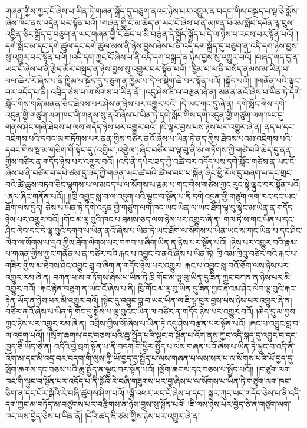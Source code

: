 གཞན་གྱིས་ཀྱང་ངོ་ཞེས་པ་ཡིན་ཏེ་གཞན་སྐྲོད་དུ་བཅུག་ནའང་ཉེས་པར་འགྱུར་ན་བདག་གིས་བསྐྲད་པ་ལྟ་ཅེ་སྨོས་ཞེས་ཁོང་ནས་འདྲེན་པར་སྟོན་པའོ། །གཞན་གྱི་ངོ་མ་ཆོད་ན་ཡང་ངོ་ཞེས་པ་ནི་མཁན་པོའམ་སློབ་དཔོན་ལྟ་བུས་འབྱིན་ཅིང་སྐྲོད་དུ་བཅུག་ན་ཡང་གཞན་གྱི་ངོ་ཆོད་པ་མི་བརྩན་དེ་སྐྲོད་སྐྲོད་པ་དེ་ལ་ཉེས་པ་རངས་པར་སྟོན་པའོ། །དགེ་སློང་མ་དང་དགེ་ཚུལ་དང་དགེ་ཚུལ་མས་ནི་ཉེས་བྱས་ཞེས་པ་ནི་འདི་དག་སྐྲོད་དུ་བཅུག་ན་འདི་དག་ཉེས་བྱས་སུ་འགྱུར་བར་སྟོན་པའོ། །འདི་དག་ཀྱང་ངོ་ཞེས་པ་ནི་འདི་དག་བསྐྲད་ན་ཉེས་བྱས་སུ་འགྱུར་བའོ། །བཞད་གད་དུ་ན་ཡང་ངོ་ཞེས་པ་ནི་རྩེད་མོར་བསྐྲད་ན་ཉེས་བྱས་སུ་འགྱུར་བར་སྟོན་པའོ། །ཁྱིམ་པ་ལ་ནི་བསོད་ནམས་མ་ཡིན་པ་ཕལ་ཆེར་རོ་ཞེས་པ་ནི་ཁྱིམ་པ་སྐྲོད་དུ་བཅུག་ན་ཁྱིམ་པ་དེ་ལ་སྡིག་ཆེ་བར་སྟོན་པའོ། །སྐྲོད་པའོ།། །།གནོན་པའི་ལྟུང་བར་འདོད་པ་ནི། འབྲིད་ཅེས་པ་ལ་སོགས་པ་ཡིན་ནོ། །འདུ་ཤེས་ཇི་ལ་བརྩན་ཞེ་ན། མནན་ནའོ་ཞེས་པ་ཡིན་ཏེ་དགེ་སློང་གིས་གཞི་མནན་ཅིང་ཐེབས་པར་ཤེས་ན་ཉེས་པར་འགྱུར་བའོ། །དེ་ཡང་གང་དུ་ཞེ་ན། དགེ་སློང་གིས་དགེ་འདུན་གྱི་གཙུག་ལག་ཁང་གི་གནས་སུ་ནའོ་ཞེས་པ་ཡིན་ཏེ་དགེ་སློང་གིས་དགེ་འདུན་གྱི་གཙུག་ལག་ཁང་དུ་གནས་ཤིང་གཞི་ཐེབས་པ་ལས་གདོད་ཉེས་པར་འགྱུར་བའོ། །ཇི་ལྟར་བྱས་པས་ཉེས་པར་འགྱུར་ཞེ་ན། ནད་པ་དང་འཇིགས་པའི་དབང་མ་གཏོགས་པར་ནན་གྱིས་བཙིར་ནའོ་ཞེས་པ་ཡིན་ཏེ་ནད་ཀྱིས་ཐེབས་པའམ་འཇིགས་པའི་དབང་གིས་སྔ་མ་གཅིག་གི་སྟེང་དུ་(འགྱིལ་‚འགྱེལ་)ཞིང་བཙིར་བ་ལྟ་བུ་ནི་མ་གཏོགས་ཀྱི་གཙེ་བའི་ཆེད་དུ་ནན་གྱིས་བཙིར་ན་གདོད་ཉེས་པར་འགྱུར་བའོ། །འདི་ནི་དཔེར་ཟད་ཀྱི་འཚེ་བར་འདོད་པས་དགེ་སློང་གཙེས་ན་ཡང་ངོ་ཞེས་པ་ནི་བཙིར་བ་དཔེ་ཙམ་དུ་ཟད་ཀྱི་གཞན་ཡང་ཚ་བའི་ཚེ་ལ་བབ་པ་སྐོན་ཞིང་ཕྱི་རོལ་དུ་བཞག་པ་དང་གྲང་བའི་ཚེ་ཆུས་བཏབ་ཅིང་ལྷགས་པ་ལ་མངད་པ་ལ་སོགས་པ་རྣམ་པ་གང་གིས་གཙེས་ཀྱང་རུང་སྟེ་ལྟུང་བར་སྟོན་པའོ། །ཞལ་ཞིང་གནོན་པའོ།། །།ཁྲི་འབྱུང་སླ་བ་ལ་འདུག་པའི་ལྟུང་བ་སྟོན་པ་ནི་དགེ་འདུན་གྱི་གཙུག་ལག་ཁང་དང་ཡང་ཐོག་ལས་བྱེད། ཅེས་པ་ཡིན་ཏེ་དགེ་འདུན་གྱི་གཙུག་ལག་ཁང་ཡང་ཡིན་ལ་ཡང་ཐོག་ལྟ་བུ་སྟེང་མ་ཡིན་ན་གདོད་ཉེས་པར་འགྱུར་བའོ། །གོང་མ་ལྟ་བུའི་ཁང་པ་ཐམས་ཅད་ལས་ཉེས་པར་འགྱུར་ཞེ་ན། གལ་ཏེ་ས་གང་ཡིན་པ་དང་ཤིང་ལེབ་དང་དེ་ལྟ་བུའི་དགབ་པ་ཡིན་ནའོ་ཞེས་པ་ཡིན་ཏེ་ཡང་ཐོག་ལ་སོགས་པ་ཡིན་ཡང་ས་གང་ཡིན་པ་དང་ཤིང་ལེབ་ལ་སོགས་པ་དྲབ་ཀྱིས་ཐོག་ལེགས་པར་བཀབ་པ་ཞིག་ཡིན་ན་ཉེས་པར་སྟོན་པའོ། །ཉེས་པར་འགྱུར་བའི་རྣམ་པ་གཞན་གྱིས་ཀྱང་གནོན་པ་ན་བཙིར་བའི་རྐང་པ་འབྱུང་བ་ནའོ་ཞེས་པ་ཡིན་ཏེ། ཁྲི་འམ་ཁྲིའུ་བཙིར་བའི་རྐང་པ་གཟིར་གྱིས་མ་ཐེབས་ཤིང་འབྱུང་བླ་བ་ཞིག་ན་གདོད་ཉེས་པར་འགྱུར། རྐང་པ་འབྱུང་སླ་བའོ་ཅོག་ལས་ཉེས་པར་འགྱུར་རམ་ཞེ་ན། བཀན་པ་མ་གཏོགས་ཞེས་པ་ཡིན་ཏེ་ཁྲི་གོང་མ་ལྟ་བུ་ཡིན་དུ་ཟིན་ཀྱང་བཀན་ན་ཉེས་པར་མི་འགྱུར་བའོ། །རྐང་རྟེན་བཅུག་ན་ཡང་ངོ་ཞེས་པ་ནི། ཁྲི་གོང་མ་ལྟ་བུ་ཡིན་དུ་ཟིན་ཀྱང་རྡོ་འམ་ཤིང་ལེབ་ལྟ་བུའི་རྐང་རྟེན་ཡོད་ན་ཉེས་པར་མི་འགྱུར་བའོ། །སྟེང་དུ་འབྱུང་བླ་བ་ཡང་ཡིན་ལ་ཇི་ལྟ་བུར་བྱས་པས་ཉེས་པར་འགྱུར་ཞེ་ན། བཙིར་ནའོ་ཞེས་པ་ཡིན་ཏེ་གོང་དུ་སྨོས་པ་ལྟ་བུའང་ཡིན་ལ་བཙིར་ན་གདོད་ཉེས་པར་འགྱུར་བའོ། །ཆེད་དུ་མ་བྱས་ཀྱང་ཉེས་པར་འགྱུར་རམ་ཞེ་ན། འབྲིས་ཀྱིས་སོ་ཞེས་པ་ཡིན་ཏེ་འདུ་ཤེས་བརྩན་པར་སྟོན་པའོ། །རྐང་པ་འབྱུང་བླ་བ་ལ་འདུག་པའོ།། །།སྲོག་ཆགས་དང་བཅས་པའི་ཆུ་སྤྱོད་པའི་ལྟུང་བ་སྟོན་པ་འོག་ནས་ཀྱང་འདི་སྐད་དུ་འབྱུང་བ་དང་ཁྱད་ཅི་ཡོད་ཅེ་ན། འདིའི་བྱེ་བྲག་སྟོན་པ་ནི་བདག་གི་ཕྱིར་སྤྱོད་པ་ལས་གཞན་པའོ་ཞེས་པ་ཡིན་ཏེ་ལྟུང་བ་འདི་ནི་འོག་མ་དང་མི་འདྲ་བར་བདག་གི་ལུས་ཀྱི་ཡོ་བྱད་དུ་སྤྱོད་པ་ལས་གཞན་པ་ལས་སར་པ་ལ་སོགས་པའི་ཡོ་བྱད་དུ་སྲོག་ཆགས་དང་བཅས་པའི་ཆུ་སྤྱོད་ན་ལྟུང་བར་སྟོན་པའོ། །སྲོག་ཆགས་དང་བཅས་པ་སྤྱོད་པའོ།། །།གཙུག་ལག་ཁང་གི་ལྟུང་བ་སྟོན་པར་འདོད་པ་ནི་སྒོའི་རེ་བཞི་གཟུགས་པར་བྱ་ཞེས་པ་ལ་སོགས་པ་ཡིན་ཏེ་གཙུག་ལག་ཁང་ཅིག་ན་དང་པོར་སྒོའི་རེ་བཞི་ཚུགས་ཤིག་པའོ། །སྒོ་འཕར་ཡང་ངོ་ཞེས་པ་དང་། སྐར་ཀུང་ཡང་གདོད་ཅེས་པ་ནི་འདི་དག་ཀྱང་མ་བཏོད་མ་བཙུགས་པར་བརྩིགས་ན་ཉེས་བྱས་སུ་སྟོན་པའོ། །ཇི་ལས་ཉེས་པར་བྱེད་ཅེ་ན་གཙུག་ལག་ཁང་ལས་བྱེད་ཅེས་པ་ཡིན་ནོ། །དེའི་ཚད་ཇི་ཙམ་གྱིས་ཉེས་པར་འགྱུར་ཞེ་ན། 